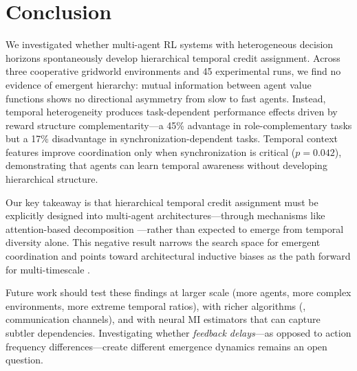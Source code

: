 \section{Conclusion}
\label{sec:conclusion}

We investigated whether multi-agent RL systems with heterogeneous decision horizons spontaneously develop hierarchical temporal credit assignment. Across three cooperative gridworld environments and 45 experimental runs, we find no evidence of emergent hierarchy: mutual information between agent value functions shows no directional asymmetry from slow to fast agents. Instead, temporal heterogeneity produces task-dependent performance effects driven by reward structure complementarity---a 45\% advantage in role-complementary tasks but a 17\% disadvantage in synchronization-dependent tasks. Temporal context features improve coordination only when synchronization is critical ($p = 0.042$), demonstrating that agents can learn temporal awareness without developing hierarchical structure.

Our key takeaway is that hierarchical temporal credit assignment must be explicitly designed into multi-agent architectures---through mechanisms like attention-based decomposition \citep{kapoor2024tar2, chen2024stas}---rather than expected to emerge from temporal diversity alone. This negative result narrows the search space for emergent coordination and points toward architectural inductive biases as the path forward for multi-timescale \marl.

Future work should test these findings at larger scale (more agents, more complex environments, more extreme temporal ratios), with richer algorithms (\mappo, communication channels), and with neural MI estimators that can capture subtler dependencies. Investigating whether \emph{feedback delays}---as opposed to action frequency differences---create different emergence dynamics remains an open question.
